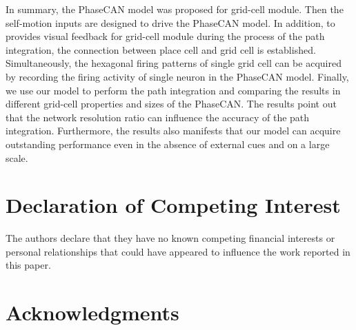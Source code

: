 \documentclass[final,5p,times,twocolumn,authoryear]{elsarticle}
\begin{document}
In summary, the PhaseCAN model was proposed for grid-cell module. Then the self-motion inputs are designed to drive the PhaseCAN model. In addition, to provides visual feedback for grid-cell module during the process of the path integration, the connection between place cell and grid cell is established. Simultaneously, the hexagonal firing patterns of single grid cell can be acquired by recording the firing activity of single neuron in the PhaseCAN model. Finally, we use our model to perform the path integration and comparing the results in different grid-cell properties and sizes of the PhaseCAN. The results point out that the network resolution ratio can influence the accuracy of the path integration. Furthermore, the results also manifests that our model can acquire outstanding performance even in the absence of external cues and on a large scale.
\section{Declaration of Competing Interest}
The authors declare that they have no known competing financial interests or personal relationships that could have appeared to influence the work reported in this paper.
\section{Acknowledgments}

%  
 






\end{document}
